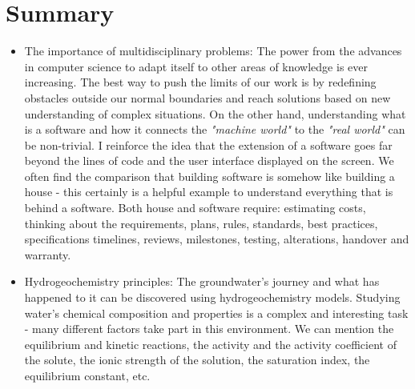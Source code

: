 \section{Summary}
\begin{itemize}
\item The importance of multidisciplinary problems: The power from the advances in computer science to adapt itself to other areas of knowledge is ever increasing. The best way to push the limits of our work is by redefining obstacles outside our normal boundaries and reach solutions based on new understanding of complex situations. On the other hand, understanding what is a software and how it connects the \emph{"machine world"} to the \emph{"real world"} can be non-trivial. I reinforce the idea that the extension of a software goes far beyond the lines of code and the user interface displayed on the screen. We often find the comparison that building software is somehow like building a house - this certainly is a helpful example to understand everything that is behind a software. Both house and software require: estimating costs, thinking about the requirements, plans, rules, standards, best practices, specifications timelines, reviews, milestones, testing, alterations, handover and warranty.
\item Hydrogeochemistry principles: The groundwater's journey and what has happened to it can be discovered using hydrogeochemistry models. Studying water's chemical composition and properties is a complex and interesting task - many different factors take part in this environment. We can mention the equilibrium and kinetic reactions, the activity and the activity coefficient of the solute, the ionic strength of the solution, the saturation index, the equilibrium constant, etc. 
\end{itemize}